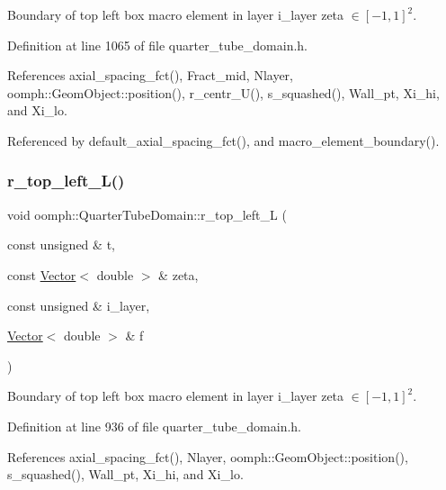Boundary of top left box macro element in layer i\+\_\+layer zeta $ \in [-1,1]^2 $. 



Definition at line 1065 of file quarter\+\_\+tube\+\_\+domain.\+h.



References axial\+\_\+spacing\+\_\+fct(), Fract\+\_\+mid, Nlayer, oomph\+::\+Geom\+Object\+::position(), r\+\_\+centr\+\_\+\+U(), s\+\_\+squashed(), Wall\+\_\+pt, Xi\+\_\+hi, and Xi\+\_\+lo.



Referenced by default\+\_\+axial\+\_\+spacing\+\_\+fct(), and macro\+\_\+element\+\_\+boundary().

\mbox{\label{classoomph_1_1QuarterTubeDomain_a17a846a90e283ec86538f17145ad7923}} 
\subsubsection{\texorpdfstring{r\+\_\+top\+\_\+left\+\_\+\+L()}{r\_top\_left\_L()}}
{\footnotesize\ttfamily void oomph\+::\+Quarter\+Tube\+Domain\+::r\+\_\+top\+\_\+left\+\_\+L (\begin{DoxyParamCaption}\item[{const unsigned \&}]{t,  }\item[{const \hyperlink{classoomph_1_1Vector}{Vector}$<$ double $>$ \&}]{zeta,  }\item[{const unsigned \&}]{i\+\_\+layer,  }\item[{\hyperlink{classoomph_1_1Vector}{Vector}$<$ double $>$ \&}]{f }\end{DoxyParamCaption})\hspace{0.3cm}{\ttfamily [private]}}



Boundary of top left box macro element in layer i\+\_\+layer zeta $ \in [-1,1]^2 $. 



Definition at line 936 of file quarter\+\_\+tube\+\_\+domain.\+h.



References axial\+\_\+spacing\+\_\+fct(), Nlayer, oomph\+::\+Geom\+Object\+::position(), s\+\_\+squashed(), Wall\+\_\+pt, Xi\+\_\+hi, and Xi\+\_\+lo.




